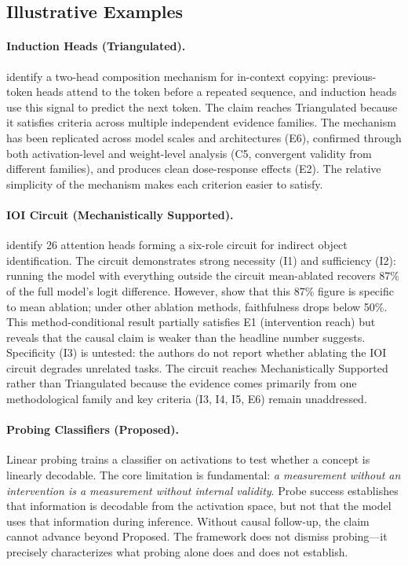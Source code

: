 \documentclass[10pt]{article}
\begin{document}
\subsection{Illustrative Examples}

\paragraph{Induction Heads (Triangulated).} \citet{olsson2022context} identify a two-head composition mechanism for in-context copying: previous-token heads attend to the token before a repeated sequence, and induction heads use this signal to predict the next token. The claim reaches Triangulated because it satisfies criteria across multiple independent evidence families. The mechanism has been replicated across model scales and architectures (E6), confirmed through both activation-level and weight-level analysis (C5, convergent validity from different families), and produces clean dose-response effects (E2). The relative simplicity of the mechanism makes each criterion easier to satisfy.

\paragraph{IOI Circuit (Mechanistically Supported).} \citet{wang2023interpretability} identify 26 attention heads forming a six-role circuit for indirect object identification. The circuit demonstrates strong necessity (I1) and sufficiency (I2): running the model with everything outside the circuit mean-ablated recovers 87\% of the full model's logit difference. However, \citet{miller2024transformer} show that this 87\% figure is specific to mean ablation; under other ablation methods, faithfulness drops below 50\%. This method-conditional result partially satisfies E1 (intervention reach) but reveals that the causal claim is weaker than the headline number suggests. Specificity (I3) is untested: the authors do not report whether ablating the IOI circuit degrades unrelated tasks. The circuit reaches Mechanistically Supported rather than Triangulated because the evidence comes primarily from one methodological family and key criteria (I3, I4, I5, E6) remain unaddressed.

\paragraph{Probing Classifiers (Proposed).} Linear probing \citep{belinkov2022probing} trains a classifier on activations to test whether a concept is linearly decodable. The core limitation is fundamental: \emph{a measurement without an intervention is a measurement without internal validity}. Probe success establishes that information is decodable from the activation space, but not that the model uses that information during inference. Without causal follow-up, the claim cannot advance beyond Proposed. The framework does not dismiss probing---it precisely characterizes what probing alone does and does not establish.
\end{document}
